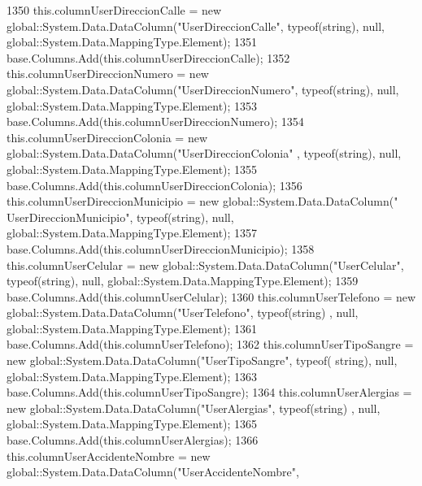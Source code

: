 \begin{DoxyCode}
1350                 this.columnUserDireccionCalle = \textcolor{keyword}{new} global::System.Data.DataColumn(\textcolor{stringliteral}{"UserDireccionCalle"}, 
      typeof(\textcolor{keywordtype}{string}), null, global::System.Data.MappingType.Element);
1351                 base.Columns.Add(this.columnUserDireccionCalle);
1352                 this.columnUserDireccionNumero = \textcolor{keyword}{new} global::System.Data.DataColumn(\textcolor{stringliteral}{"UserDireccionNumero"}, 
      typeof(\textcolor{keywordtype}{string}), null, global::System.Data.MappingType.Element);
1353                 base.Columns.Add(this.columnUserDireccionNumero);
1354                 this.columnUserDireccionColonia = \textcolor{keyword}{new} global::System.Data.DataColumn(\textcolor{stringliteral}{"UserDireccionColonia"}
      , typeof(\textcolor{keywordtype}{string}), null, global::System.Data.MappingType.Element);
1355                 base.Columns.Add(this.columnUserDireccionColonia);
1356                 this.columnUserDireccionMunicipio = \textcolor{keyword}{new} global::System.Data.DataColumn(\textcolor{stringliteral}{"
      UserDireccionMunicipio"}, typeof(\textcolor{keywordtype}{string}), null, global::System.Data.MappingType.Element);
1357                 base.Columns.Add(this.columnUserDireccionMunicipio);
1358                 this.columnUserCelular = \textcolor{keyword}{new} global::System.Data.DataColumn(\textcolor{stringliteral}{"UserCelular"}, typeof(\textcolor{keywordtype}{string}), 
      null, global::System.Data.MappingType.Element);
1359                 base.Columns.Add(this.columnUserCelular);
1360                 this.columnUserTelefono = \textcolor{keyword}{new} global::System.Data.DataColumn(\textcolor{stringliteral}{"UserTelefono"}, typeof(\textcolor{keywordtype}{string})
      , null, global::System.Data.MappingType.Element);
1361                 base.Columns.Add(this.columnUserTelefono);
1362                 this.columnUserTipoSangre = \textcolor{keyword}{new} global::System.Data.DataColumn(\textcolor{stringliteral}{"UserTipoSangre"}, typeof(\textcolor{keywordtype}{
      string}), null, global::System.Data.MappingType.Element);
1363                 base.Columns.Add(this.columnUserTipoSangre);
1364                 this.columnUserAlergias = \textcolor{keyword}{new} global::System.Data.DataColumn(\textcolor{stringliteral}{"UserAlergias"}, typeof(\textcolor{keywordtype}{string})
      , null, global::System.Data.MappingType.Element);
1365                 base.Columns.Add(this.columnUserAlergias);
1366                 this.columnUserAccidenteNombre = \textcolor{keyword}{new} global::System.Data.DataColumn(\textcolor{stringliteral}{"UserAccidenteNombre"}, 

\end{DoxyCode}
